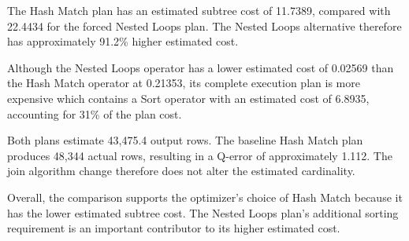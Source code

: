 The Hash Match plan has an estimated subtree cost of 11.7389, compared with 22.4434 for the forced Nested Loops plan. The Nested Loops alternative therefore has approximately 91.2\% higher estimated cost.

Although the Nested Loops operator has a lower estimated cost of 0.02569 than the Hash Match operator at 0.21353, its complete execution plan is more expensive which contains a Sort operator with an estimated cost of 6.8935, accounting for 31\% of the plan cost.

Both plans estimate 43,475.4 output rows. The baseline Hash Match plan produces 48,344 actual rows, resulting in a Q-error of approximately 1.112. The join algorithm change therefore does not alter the estimated cardinality.

Overall, the comparison supports the optimizer's choice of Hash Match because it has the lower estimated subtree cost. The Nested Loops plan's additional sorting requirement is an important contributor to its higher estimated cost.